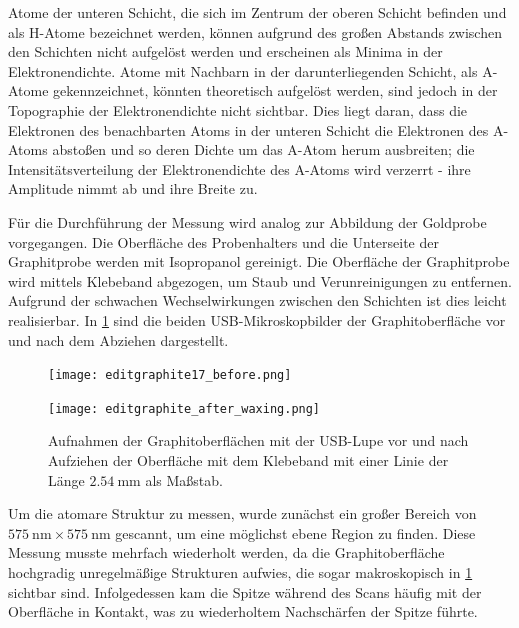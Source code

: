 Atome der unteren Schicht, die sich im Zentrum der oberen Schicht befinden und als H-Atome bezeichnet werden, können aufgrund des großen Abstands zwischen den Schichten nicht aufgelöst werden und erscheinen als Minima in der Elektronendichte. 
Atome mit Nachbarn in der darunterliegenden Schicht, als A-Atome gekennzeichnet, könnten theoretisch aufgelöst werden, sind jedoch in der Topographie der Elektronendichte nicht sichtbar. 
Dies liegt daran, dass die Elektronen des benachbarten Atoms in der unteren Schicht die Elektronen des A-Atoms abstoßen und so deren Dichte um das A-Atom herum ausbreiten; die Intensitätsverteilung der Elektronendichte des A-Atoms wird verzerrt - ihre Amplitude nimmt ab und ihre Breite zu.


Für die Durchführung der Messung wird analog zur Abbildung der Goldprobe vorgegangen. 
Die Oberfläche des Probenhalters und die Unterseite der Graphitprobe werden mit Isopropanol gereinigt.
Die Oberfläche der Graphitprobe wird mittels Klebeband abgezogen, um Staub und Verunreinigungen zu entfernen. Aufgrund der schwachen Wechselwirkungen zwischen den Schichten ist dies leicht realisierbar. 
In \cref{fig:graphene} sind die beiden USB-Mikroskopbilder der Graphitoberfläche vor und nach dem Abziehen dargestellt.

\begin{figure}[H]
    \centering
    \begin{minipage}[t]{0.495\textwidth}
        \centering
        \texttt{[image: editgraphite17\_before.png]}
        \label{fig:graphenea}
    \end{minipage}
    \hfill
    \begin{minipage}[t]{0.495\textwidth}
        \centering
        \texttt{[image: editgraphite\_after\_waxing.png]}
        \label{fig:grapheneb}
    \end{minipage}
    \caption{
      Aufnahmen der Graphitoberflächen mit der USB-Lupe vor und nach Aufziehen der Oberfläche mit dem Klebeband mit einer Linie der Länge $\SI{2.54}{\mm}$ als Maßstab.
}
    \label{fig:graphene}
\end{figure}

Um die atomare Struktur zu messen, wurde zunächst ein großer Bereich von $\SI{575}{\nm} \times \SI{575}{\nm}$ gescannt, um eine möglichst ebene Region zu finden. 
Diese Messung musste mehrfach wiederholt werden, da die Graphitoberfläche hochgradig unregelmäßige Strukturen aufwies, die sogar makroskopisch in \cref{fig:graphene} sichtbar sind. 
Infolgedessen kam die Spitze während des Scans häufig mit der Oberfläche in Kontakt, was zu wiederholtem Nachschärfen der Spitze führte. 


